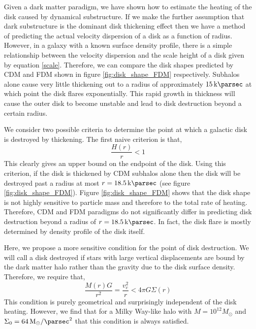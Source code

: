 \documentclass[usenatbib]{mnras}
\begin{document}
Given a dark matter paradigm, we have shown how to estimate the heating of the disk caused by dynamical substructure. If we make the further assumption that dark substructure is the dominant disk thickening effect then we have a method of predicting the actual velocity dispersion of a disk as a function of radius. However, in a galaxy with a known surface density   profile, there is a simple relationship between the velocity dispersion and the scale height of a disk given by equation \ref{scale}. Therefore, we can compare the disk shapes predicted by CDM and FDM shown in figure \ref{fig:disk_shape_FDM} respectively. Subhalos alone cause very little thickening out to a radius of approximately $\SI{15}{\kilo \parsec}$ at which point the disk flares exponentially. This rapid growth in thickness will cause the outer disk to become unstable and lead to disk destruction beyond a certain radius. 
\par 
We consider two possible criteria to determine the point at which a galactic disk is destroyed by thickening. The first naive criterion is that, 
\begin{equation}
\frac{H(r)}{r} < 1
\end{equation}
This clearly gives an upper bound on the endpoint of the disk. Using this criterion, if the disk is thickened by CDM subhalos alone then the disk will be destroyed past a radius at most $r = \SI{18.5}{\kilo \parsec}$ (see figure \ref{fig:disk_shape_FDM}). Figure \ref{fig:disk_shape_FDM} shows that the disk shape is not highly sensitive to particle mass and therefore to the total rate of heating. Therefore, CDM and FDM paradigms do not significantly differ in predicting disk destruction beyond a radius of $r = \SI{18.5}{\kilo \parsec}$. In fact, the disk flare is mostly determined by density profile of the disk itself.  
\par
	Here, we propose a more sensitive condition for the point of disk destruction. We will call a disk destroyed if stars with large vertical displacements are bound by the dark matter halo rather than the gravity due to the disk surface density. Therefore, we require that,
\begin{equation}
\frac{M(r) G}{r^2} = \frac{v_c^2}{r} < 4 \pi G \Sigma(r) 
\end{equation}   
This condition is purely geometrical and surprisingly independent of the disk heating. However, we find that for a Milky Way-like halo with $M = 10^{12} M_{\odot}$ and $\Sigma_0 = \SI{64}{M_{\odot} \per \parsec \squared}$ that this condition is always satisfied. 
\end{document}
